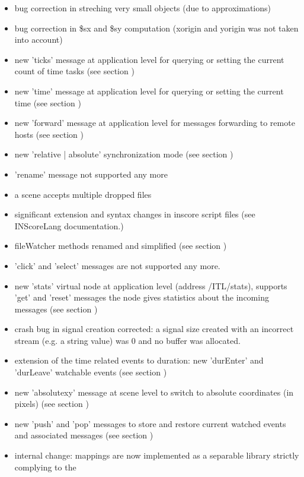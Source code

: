 \begin{itemize}
\item bug correction in streching very small objects (due to approximations)
\item bug correction in \$sx and \$sy computation (xorigin and yorigin was not taken into account)
\item new 'ticks' message at application level for querying or setting the current count of time tasks (see section )
\item new 'time' message at application level for querying or setting the current time (see section )
\item new 'forward' message at application level for messages forwarding to remote hosts (see section )
\item new 'relative | absolute' synchronization mode (see section )
\item 'rename' message not supported any more
\item a scene accepts multiple dropped files
\item significant extension and syntax changes in inscore script files (see INScoreLang documentation.)
\item fileWatcher methods renamed and simplified (see section )
\item 'click' and 'select' messages are not supported any more.
\item new 'stats' virtual node at application level (address /ITL/stats), supports 'get' and 'reset' messages
  the node gives statistics about the incoming messages (see section )
\item crash bug in signal creation corrected: a signal size created with an incorrect stream 
  (e.g. a string value) was 0 and no buffer was allocated.
\item extension of the time related events to duration: new 'durEnter' and 'durLeave' watchable events (see section )
\item new 'absolutexy' message at scene level to switch to absolute coordinates (in pixels) (see section )
\item new 'push' and 'pop' messages to store and restore current watched events and associated messages (see section )
\item internal change: mappings are now implemented as a separable library strictly complying to the 

\end{itemize}
